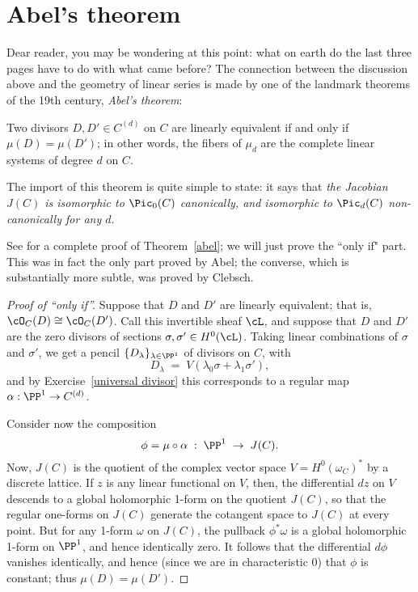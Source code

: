 \section{Abel's theorem}

Dear reader, you may be wondering at this point: what on earth do the last three pages have to do with what came before? The connection between the discussion above and the geometry of linear series is made by one of the landmark theorems of the 19th century, \emph{Abel's theorem}:

\begin{theorem}\label{abel}
Two divisors $D, D' \in C^{(d)}$ on $C$ are linearly equivalent if and only if $\mu(D) = \mu(D')$; in other words, the fibers of $\mu_d$ are the complete linear systems of degree $d$ on $C$.
\end{theorem}

The import of this theorem is quite simple to state: it says that \emph{the Jacobian $J(C)$ is isomorphic to $\Pic_0(C)$ canonically, and isomorphic to $\Pic_d(C)$ non-canonically for any $d$}.

See \cite[Section 2.2]{Griffiths-Harris1978}  for a complete proof of Theorem~\ref{abel}; we will just prove the ``only if" part. This was in fact the only part proved by Abel; the converse, which is substantially more subtle, was proved by Clebsch.

\begin{proof}[Proof of ``only if'']
Suppose that $D$ and $D'$ are linearly equivalent; that is, $\cO_C(D) \cong \cO_C(D')$. Call this invertible sheaf $\cL$, and suppose that $D$ and $D'$ are the zero divisors of sections $\sigma, \sigma' \in H^0(\cL)$.
Taking linear combinations of $\sigma$ and $\sigma'$, we get a pencil $\{D_\lambda\}_{\lambda \in \PP^1}$ of divisors on $C$, with
$$
D_\lambda \; = \; V(\lambda_0\sigma + \lambda_1\sigma'),
$$
and by Exercise~\ref{universal divisor} this corresponds to a regular map $\alpha : \PP^1 \to C^{(d)}$. 

Consider now the composition
$$
\phi = \mu \circ \alpha \; : \; \PP^1 \; \to \; J(C).
$$
Now, $J(C)$ is the quotient of the complex vector space $V = H^0(\omega_C)^*$ by a discrete lattice. If $z$ is any linear functional on $V$, then, the differential $dz$  on $V$ descends to a global holomorphic 1-form on the quotient $J(C)$, so that the regular one-forms on $J(C)$ generate the cotangent space to $J(C)$ at every point. But for any 1-form $\omega$ on $J(C)$, the pullback $\phi^*\omega$ is a global holomorphic 1-form on $\PP^1$, and hence identically zero. It follows that the differential $d\phi$ vanishes identically, and hence (since we are in characteristic 0) that $\phi$ is constant; thus $\mu(D) = \mu(D')$.
\end{proof}

